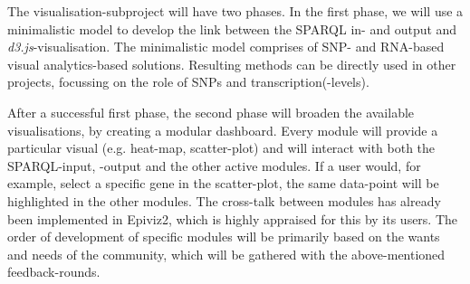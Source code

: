 \documentclass[twoside,fontsize=12pt]{article}
\begin{document}
\noindent
The visualisation-subproject will have two phases. In the first phase, we will use a minimalistic model to develop the link between the SPARQL in- and output and \textit{d3.js}-visualisation. The minimalistic model comprises of SNP- and RNA-based visual analytics-based solutions. Resulting methods can be directly used in other projects, focussing on the role of SNPs and transcription(-levels).

After a successful first phase, the second phase will broaden the available visualisations, by creating a modular dashboard. Every module will provide a particular visual (e.g. heat-map, scatter-plot) and will interact with both the SPARQL-input, -output and the other active modules. If a user would, for example, select a specific gene in the scatter-plot, the same data-point will be highlighted in the other modules. The cross-talk between modules has already been implemented in Epiviz2\cite{Chelaru2014}, which is highly appraised for this by its users. The order of development of specific modules will be primarily based on the wants and needs of the community, which will be gathered with the above-mentioned feedback-rounds.
\end{document}
